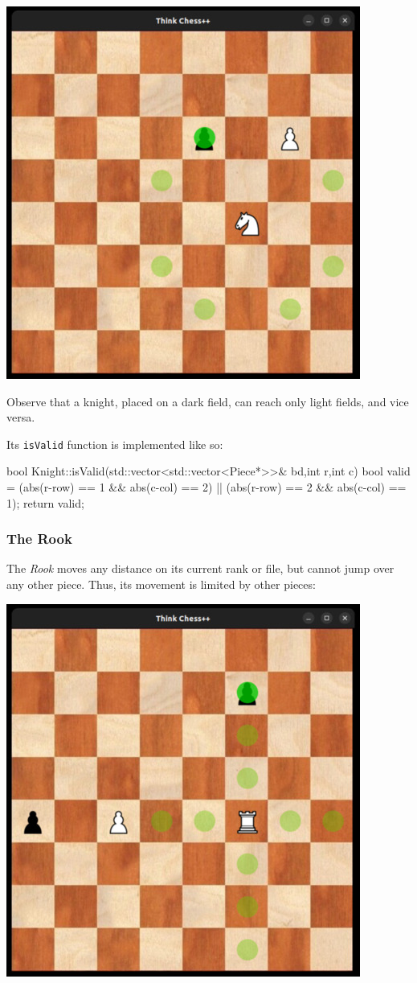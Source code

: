 \begin{center}
\includegraphics[width=.5\linewidth]{../img/knight.jpg}
\end{center}

Observe that a knight, placed on a dark field, can reach only light fields, and vice versa.

Its \texttt{isValid} function is implemented like so:

\begin{cpp}
bool Knight::isValid(std::vector<std::vector<Piece*>>& bd,int r,int c) {
  bool valid = (abs(r-row) == 1 && abs(c-col) == 2) ||
               (abs(r-row) == 2 && abs(c-col) == 1);
  return valid;
}
\end{cpp}

\subsubsection{The Rook}
The \emph{Rook} moves any distance on its current rank or file, but cannot jump over any other piece.
Thus, its movement is limited by other pieces:

\begin{center}
\includegraphics[width=.5\linewidth]{../img/rook.jpg}
\end{center}

